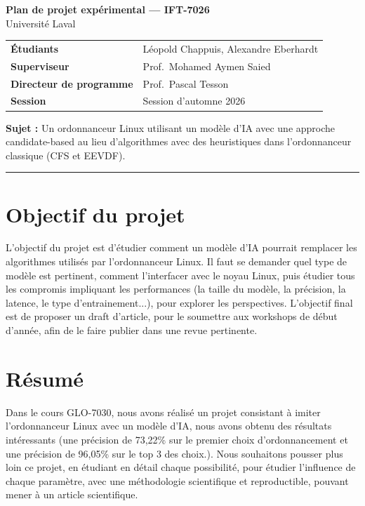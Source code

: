 \documentclass[11pt,a4paper]{article}
\newcommand{\projetTitre}{Plan de projet expérimental — IFT-7026}
\newcommand{\projetSujet}{Un ordonnanceur Linux utilisant un modèle d'IA avec une approche candidate-based au lieu d'algorithmes avec des heuristiques dans l'ordonnanceur classique (CFS et EEVDF). }
\newcommand{\projetSuperviseur}{Prof.\ Mohamed Aymen Saied}
\newcommand{\projetDirecteur}{Prof.\ Pascal Tesson}
\newcommand{\projetEtudiantUn}{Léopold Chappuis}
\newcommand{\projetEtudiantDeux}{Alexandre Eberhardt}
\newcommand{\projetSession}{Session d'automne 2026}
\newcommand{\projetUniversite}{Université Laval}
\begin{document}
\begin{center}
  {\LARGE\bfseries \projetTitre}\\[0.4em]
  {\large \projetUniversite}
\end{center}

\vspace{0.8em}
\noindent
\begin{tabular}{@{}ll@{}}
  \textbf{Étudiants}              & \projetEtudiantUn{}, \projetEtudiantDeux \\
  \textbf{Superviseur}            & \projetSuperviseur \\
  \textbf{Directeur de programme} & \projetDirecteur \\
  \textbf{Session}                & \projetSession \\
\end{tabular}

\vspace{0.6em}
\noindent\textbf{Sujet :} \projetSujet

\vspace{0.4em}
\hrule
\vspace{1.2em}

\section{Objectif du projet}
L'objectif du projet est d'étudier comment un modèle d'IA pourrait remplacer les algorithmes utilisés par l'ordonnanceur Linux. Il faut se demander quel type de modèle est pertinent, comment l'interfacer avec le noyau Linux, puis étudier tous les compromis impliquant les performances (la taille du modèle, la précision, la latence, le type d'entrainement...), pour explorer les perspectives.
L'objectif final est de proposer un draft d'article, pour le soumettre aux workshops de début d'année, afin de le faire publier dans une revue pertinente.


\section{Résumé}
Dans le cours GLO-7030, nous avons réalisé un projet consistant à imiter l'ordonnanceur Linux avec un modèle d'IA, nous avons obtenu des résultats intéressants (une précision de 73,22\% sur le premier choix d'ordonnancement et une précision de 96,05\% sur le top 3 des choix.). Nous souhaitons pousser plus loin ce projet, en étudiant en détail chaque possibilité, pour étudier l'influence de chaque paramètre, avec une méthodologie scientifique et reproductible, pouvant mener à un article scientifique.
\end{document}
